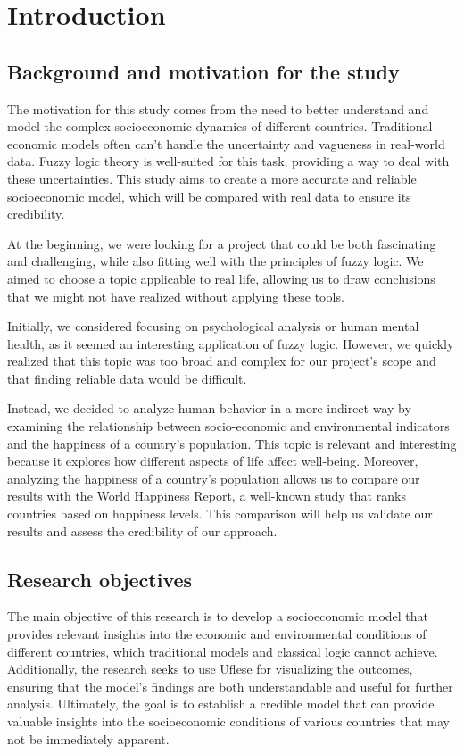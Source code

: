 \documentclass[fleqn,11pt]{article}
\begin{document}


\newpage
\tableofcontents

\newpage

\section{Introduction}

\subsection{Background and motivation for the study}
The motivation for this study comes from the need to better understand and model the complex socioeconomic dynamics of different countries. Traditional economic models often can't handle the uncertainty and vagueness in real-world data. Fuzzy logic theory is well-suited for this task, providing a way to deal with these uncertainties. This study aims to create a more accurate and reliable socioeconomic model, which will be compared with real data to ensure its credibility.

At the beginning, we were looking for a project that could be both fascinating and challenging, while also fitting well with the principles of fuzzy logic. We aimed to choose a topic applicable to real life, allowing us to draw conclusions that we might not have realized without applying these tools.

Initially, we considered focusing on psychological analysis or human mental health, as it seemed an interesting application of fuzzy logic. However, we quickly realized that this topic was too broad and complex for our project's scope and that finding reliable data would be difficult.

Instead, we decided to analyze human behavior in a more indirect way by examining the relationship between socio-economic and environmental indicators and the happiness of a country's population. This topic is relevant and interesting because it explores how different aspects of life affect well-being. Moreover, analyzing the happiness of a country's population allows us to compare our results with the World Happiness Report, a well-known study that ranks countries based on happiness levels. This comparison will help us validate our results and assess the credibility of our approach.
\subsection{Research objectives}
The main objective of this research is to develop a socioeconomic model that provides relevant insights into the economic and environmental conditions of different countries, which traditional models and classical logic cannot achieve. Additionally, the research seeks to use Uflese for visualizing the outcomes, ensuring that the model's findings are both understandable and useful for further analysis. Ultimately, the goal is to establish a credible model that can provide valuable insights into the socioeconomic conditions of various countries that may not be immediately apparent.
\end{document}
